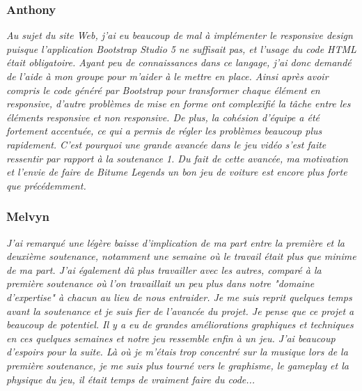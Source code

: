 \documentclass[a4paper,12pt]{article}
\begin{document}
         \subsubsection{Anthony}
                \textit{Au sujet du site Web, j'ai eu beaucoup de mal à implémenter le responsive design
                puisque l'application Bootstrap Studio 5 ne suffisait pas, et l'usage du code HTML était
                obligatoire. Ayant peu de connaissances dans ce langage, j'ai donc demandé
                de l'aide à mon groupe pour m'aider à le mettre en place. Ainsi après avoir compris le
                code généré par Bootstrap pour transformer chaque élément en responsive, d'autre
                problèmes de mise en forme ont complexifié la tâche entre les éléments responsive et
                non responsive. De plus, la cohésion d'équipe a été fortement accentuée, ce qui a permis de régler 
                les problèmes beaucoup plus rapidement. C'est pourquoi une grande avancée dans le 
                jeu vidéo s'est faite ressentir par rapport à la soutenance 1. Du fait de cette avancée, 
                ma motivation et l'envie de faire de Bitume Legends un bon jeu de voiture est encore 
                plus forte que précédemment.}

            \subsubsection{Melvyn}
                \textit{J'ai remarqué une légère baisse d'implication de ma part entre la 
                première et la deuxième soutenance, notamment une semaine où le 
                travail était plus que minime de ma part. J'ai également dû plus 
                travailler avec les autres, comparé à la première soutenance où l'on
                travaillait un peu plus dans notre "domaine d'expertise" à chacun 
                au lieu de nous entraider. Je me suis reprit quelques temps avant la
                soutenance et je suis fier de l'avancée du projet. Je pense que ce projet
                a beaucoup de potentiel. Il y a eu de grandes améliorations graphiques et
                techniques en ces quelques semaines et notre jeu ressemble enfin à un jeu.
                J'ai beaucoup d'espoirs pour la suite. Là où je m'étais trop concentré sur
                la musique lors de la première soutenance, je me suis plus tourné vers
                le graphisme, le gameplay et la physique du jeu, il était temps de vraiment
                faire du code...}
\end{document}

